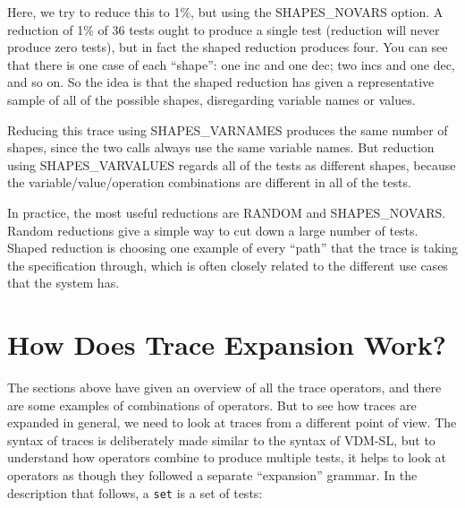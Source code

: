 \documentclass{overturerepchap}
\begin{document}
Here, we try to reduce this to 1\%, but using the SHAPES\_NOVARS option. A
reduction of 1\% of 36 tests ought to produce a single test (reduction will
never produce zero tests), but in fact the shaped reduction produces four. You
can see that there is one case of each ``shape'': one inc and one dec; two incs
and one dec, and so on. So the idea is that the shaped reduction has given a
representative sample of all of the possible shapes, disregarding variable names
or values.

Reducing this trace using SHAPES\_VARNAMES produces the same number of shapes,
since the two calls always use the same variable names. But reduction using
SHAPES\_VARVALUES regards all of the tests as different shapes, because the
variable/value/operation combinations are different in all of the tests.

In practice, the most useful reductions are RANDOM and SHAPES\_NOVARS. Random
reductions give a simple way to cut down a large number of tests. Shaped
reduction is choosing one example of every ``path'' that the trace is taking the
specification through, which is often closely related to the different use cases
that the system has.


\section{How Does Trace Expansion Work?}

The sections above have given an overview of all the trace operators, and there
are some examples of combinations of operators. But to see how traces are
expanded in general, we need to look at traces from a different point of view.
The syntax of traces is deliberately made similar to the syntax of VDM-SL, but
to understand how operators combine to produce multiple tests, it helps to look
at operators as though they followed a separate ``expansion'' grammar. In the
description that follows, a \texttt{set} is a set of tests:
\end{document}
